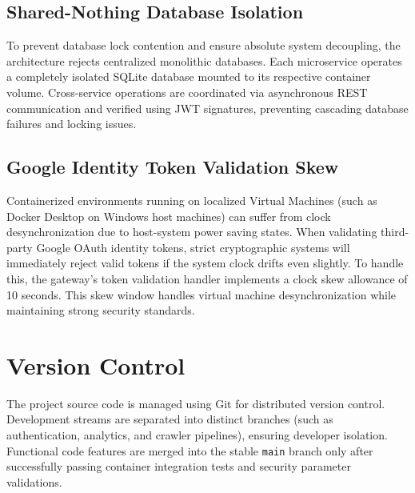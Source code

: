 \subsection{Shared-Nothing Database Isolation}
To prevent database lock contention and ensure absolute system decoupling, the architecture rejects centralized monolithic databases. Each microservice operates a completely isolated SQLite database mounted to its respective container volume. Cross-service operations are coordinated via asynchronous REST communication and verified using JWT signatures, preventing cascading database failures and locking issues.

\subsection{Google Identity Token Validation Skew}
Containerized environments running on localized Virtual Machines (such as Docker Desktop on Windows host machines) can suffer from clock desynchronization due to host-system power saving states. When validating third-party Google OAuth identity tokens, strict cryptographic systems will immediately reject valid tokens if the system clock drifts even slightly. To handle this, the gateway's token validation handler implements a clock skew allowance of 10 seconds. This skew window handles virtual machine desynchronization while maintaining strong security standards.

\section{Version Control}
The project source code is managed using Git for distributed version control. Development streams are separated into distinct branches (such as authentication, analytics, and crawler pipelines), ensuring developer isolation. Functional code features are merged into the stable \texttt{main} branch only after successfully passing container integration tests and security parameter validations.
